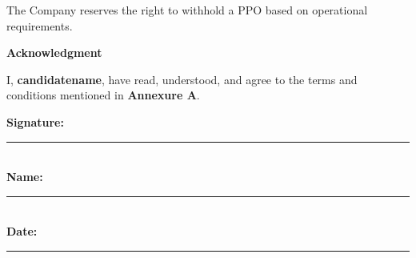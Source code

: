 \documentclass[a4paper,12pt]{article}
\begin{document}
\noindent
The Company reserves the right to withhold a PPO based on operational requirements.

\newpage

\begin{center}
    {\LARGE \textbf{Acknowledgment}} \\[1cm]
\end{center}

\noindent
I, \textbf{candidatename}, have read, understood, and agree to the terms and conditions mentioned in \textbf{Annexure A}.

\vspace{2cm}
\noindent

\textbf{Signature:} \hspace{1cm} \rule{5cm}{0.5pt} \\

\textbf{Name:} \hspace{1.7cm} \rule{5cm}{0.5pt} \\

\textbf{Date:} \hspace{1.8cm} \rule{5cm}{0.5pt}
\end{document}
